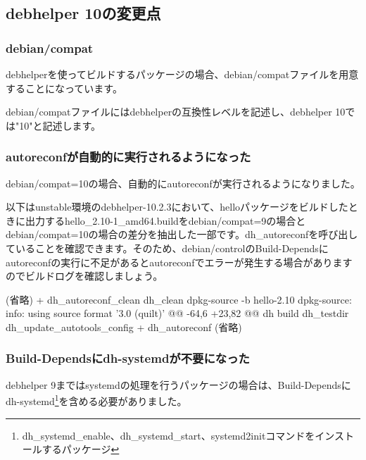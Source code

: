 \documentclass[mingoth,a4paper]{jsarticle}
\begin{document}
\subsection{debhelper 10の変更点}

\subsubsection{debian/compat}

debhelperを使ってビルドするパッケージの場合、debian/compatファイルを用意することになっています。

debian/compatファイルにはdebhelperの互換性レベルを記述し、debhelper 10では"10"と記述します。



\subsubsection{autoreconfが自動的に実行されるようになった}

debian/compat=10の場合、自動的にautoreconfが実行されるようになりました。

以下はunstable環境のdebhelper-10.2.3において、helloパッケージをビルドしたときに出力するhello\_2.10-1\_amd64.buildをdebian/compat=9の場合とdebian/compat=10の場合の差分を抽出した一部です。dh\_autoreconfを呼び出していることを確認できます。そのため、debian/controlのBuild-Dependsにautoreconfの実行に不足があるとautoreconfでエラーが発生する場合がありますのでビルドログを確認しましょう。

\begin{commandline}
  (省略)
+   dh_autoreconf_clean
    dh_clean
  dpkg-source -b hello-2.10
 dpkg-source: info: using source format '3.0 (quilt)'
@@ -64,6 +23,82 @@
 dh build
    dh_testdir
    dh_update_autotools_config
+   dh_autoreconf
  (省略)
\end{commandline}

  
\subsubsection{Build-Dependsにdh-systemdが不要になった}

debhelper 9まではsystemdの処理を行うパッケージの場合は、Build-Dependsにdh-systemd\footnote{dh\_systemd\_enable、dh\_systemd\_start、systemd2initコマンドをインストールするパッケージ}を含める必要がありました。
\end{document}
